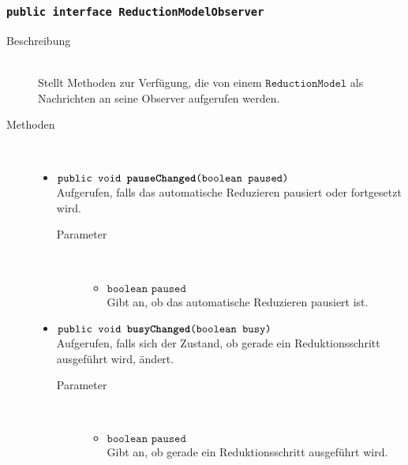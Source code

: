 \subsubsection{\normalfont \texttt{public interface \textbf{ReductionModelObserver}}}

\begin{description}
\item[Beschreibung] \hfill \\ Stellt Methoden zur Verfügung, die von einem $\texttt{ReductionModel}$ als Nachrichten an seine Observer aufgerufen werden.

\item[Methoden] \hfill \\
	\vspace{-.8cm}
	\begin{itemize}
		\item $\texttt{public void \textbf{pauseChanged}(boolean paused)}$ \\ Aufgerufen, falls das automatische Reduzieren pausiert oder fortgesetzt wird.
		\begin{description}
			\item[Parameter] \hfill \\
			\vspace{-.8cm}
			\begin{itemize}
				\item $\texttt{boolean paused}$ \\ Gibt an, ob das automatische Reduzieren pausiert ist.
			\end{itemize}
		\end{description}
		
		\item $\texttt{public void \textbf{busyChanged}(boolean busy)}$ \\ Aufgerufen, falls sich der Zustand, ob gerade ein Reduktionsschritt ausgeführt wird, ändert.
		\begin{description}
			\item[Parameter] \hfill \\
			\vspace{-.8cm}
			\begin{itemize}
				\item $\texttt{boolean paused}$ \\ Gibt an, ob gerade ein Reduktionsschritt ausgeführt wird.
			\end{itemize}
		\end{description}
		

\end{itemize}
\end{description}

